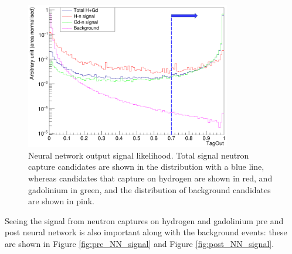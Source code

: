 \begin{figure}
    \centering
    \includegraphics[width=0.8\textwidth]{Figures/tagout.png}
    \caption{Neural network output signal likelihood. Total signal neutron capture candidates are shown in the distribution with a blue line, whereas candidates that capture on hydrogen are shown in red, and gadolinium in green, and the distribution of background candidates are shown in pink.}
    \label{fig:tagout}
\end{figure}


Seeing the signal from neutron captures on hydrogen and gadolinium pre and post neural network is also important along with the background events: these are shown in Figure \ref{fig:pre_NN_signal} and Figure \ref{fig:post_NN_signal}. 



